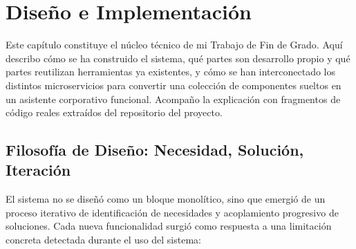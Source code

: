 \chapter{Diseño e Implementación}
\label{cap:implementacion}

Este capítulo constituye el núcleo técnico de mi Trabajo de Fin de Grado. Aquí describo cómo se ha construido el sistema, qué partes son desarrollo propio y qué partes reutilizan herramientas ya existentes, y cómo se han interconectado los distintos microservicios para convertir una colección de componentes sueltos en un asistente corporativo funcional. Acompaño la explicación con fragmentos de código reales extraídos del repositorio del proyecto.

\section{Filosofía de Diseño: Necesidad, Solución, Iteración}
\label{sec:filosofia}

El sistema no se diseñó como un bloque monolítico, sino que emergió de un proceso iterativo de identificación de necesidades y acoplamiento progresivo de soluciones. Cada nueva funcionalidad surgió como respuesta a una limitación concreta detectada durante el uso del sistema:

